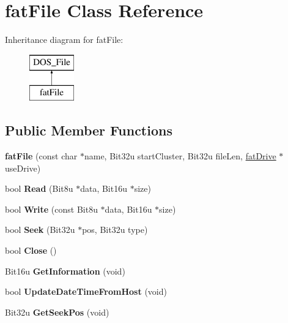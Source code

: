 \hypertarget{classfatFile}{\section{fat\-File Class Reference}
\label{classfatFile}
}
Inheritance diagram for fat\-File\-:\begin{figure}[H]
\begin{center}
\leavevmode
\includegraphics[height=2.000000cm]{classfatFile}
\end{center}
\end{figure}
\subsection*{Public Member Functions}
\begin{DoxyCompactItemize}
\item 
\hypertarget{classfatFile_a707d8a2cc98be6e70f191eeca63b12bc}{{\bfseries fat\-File} (const char $\ast$name, Bit32u start\-Cluster, Bit32u file\-Len, \hyperlink{classfatDrive}{fat\-Drive} $\ast$use\-Drive)}\label{classfatFile_a707d8a2cc98be6e70f191eeca63b12bc}

\item 
\hypertarget{classfatFile_a17397bf2de02a0f9dec751d705f2003e}{bool {\bfseries Read} (Bit8u $\ast$data, Bit16u $\ast$size)}\label{classfatFile_a17397bf2de02a0f9dec751d705f2003e}

\item 
\hypertarget{classfatFile_a968ede46dea29d73a0c3165b0f48e20f}{bool {\bfseries Write} (const Bit8u $\ast$data, Bit16u $\ast$size)}\label{classfatFile_a968ede46dea29d73a0c3165b0f48e20f}

\item 
\hypertarget{classfatFile_a9c778000be1ecb549b792d46acd70aae}{bool {\bfseries Seek} (Bit32u $\ast$pos, Bit32u type)}\label{classfatFile_a9c778000be1ecb549b792d46acd70aae}

\item 
\hypertarget{classfatFile_a19fc793fd59386b935bdb92b27419089}{bool {\bfseries Close} ()}\label{classfatFile_a19fc793fd59386b935bdb92b27419089}

\item 
\hypertarget{classfatFile_a6fe1adbe5bc4c82a888fd96aa719c4de}{Bit16u {\bfseries Get\-Information} (void)}\label{classfatFile_a6fe1adbe5bc4c82a888fd96aa719c4de}

\item 
\hypertarget{classfatFile_a8bec49bbadaf2ee88e2a5cf65499f2e8}{bool {\bfseries Update\-Date\-Time\-From\-Host} (void)}\label{classfatFile_a8bec49bbadaf2ee88e2a5cf65499f2e8}

\item 
\hypertarget{classfatFile_a071f47d13150ce99c7a14aee01808322}{Bit32u {\bfseries Get\-Seek\-Pos} (void)}\label{classfatFile_a071f47d13150ce99c7a14aee01808322}

\end{DoxyCompactItemize}
